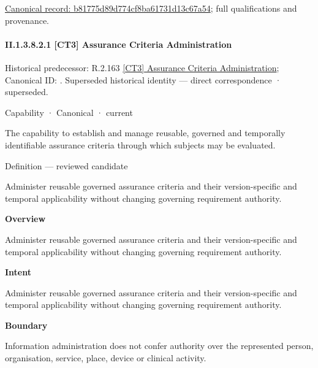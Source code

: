 {\footnotesize \href{../../../../continuum/strategy/capability/b81775d89d774cf8ba61731d13c67a54.md}{Canonical record: b81775d89d774cf8ba61731d13c67a54}; full qualifications and provenance.}\par
\paragraph*{II.1.3.8.2.1 [CT3] Assurance Criteria Administration}
\label{navigation:II.1.3.8.2.1}

{\small Historical predecessor: R.2.163 \hyperref[element:6dab08ab1e3249d7b314843ca9ed0149]{[CT3] Assurance Criteria Administration}; Canonical ID: \texttt{}. Superseded historical identity — direct correspondence · superseded.}\par
\label{element:1bfd71f24321428c8871b587d413f47e}
{\small Capability · Canonical · current}\par

The capability to establish and manage reusable, governed and temporally identifiable assurance criteria through which subjects may be evaluated.



Definition — reviewed candidate



Administer reusable governed assurance criteria and their version-specific and temporal applicability without changing governing requirement authority.



\textbf{Overview}



Administer reusable governed assurance criteria and their version-specific and temporal applicability without changing governing requirement authority.



\textbf{Intent}



Administer reusable governed assurance criteria and their version-specific and temporal applicability without changing governing requirement authority.



\textbf{Boundary}



Information administration does not confer authority over the represented person, organisation, service, place, device or clinical activity.



